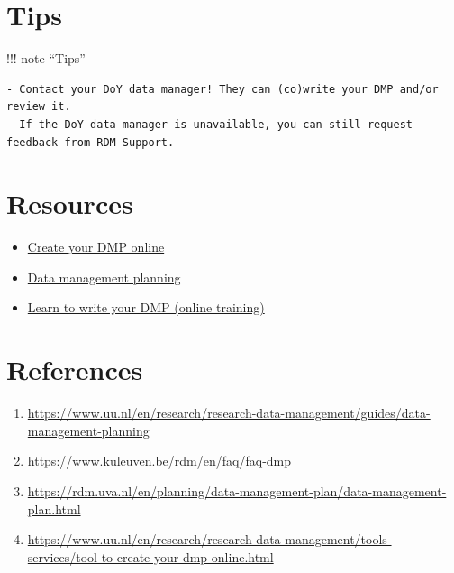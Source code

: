 \documentclass[
  letterpaper,
  DIV=11,
  numbers=noendperiod]{scrreprt}
\providecommand{\tightlist}{%
  \setlength{\itemsep}{0pt}\setlength{\parskip}{0pt}}\usepackage{longtable,booktabs,array}
\begin{document}
\hypertarget{tips}{%
\section*{Tips}\label{tips}}


!!! note ``Tips''

\begin{verbatim}
- Contact your DoY data manager! They can (co)write your DMP and/or review it.
- If the DoY data manager is unavailable, you can still request feedback from RDM Support.
\end{verbatim}

\hypertarget{resources}{%
\section*{Resources}\label{resources}}


\begin{itemize}
\tightlist
\item
  \href{https://www.uu.nl/en/research/research-data-management/tools-services/tool-to-create-your-dmp-online}{Create
  your DMP online}
\item
  \href{https://www.uu.nl/en/research/research-data-management/guides/data-management-planning}{Data
  management planning}
\item
  \href{https://www.uu.nl/en/research/research-data-management/training-workshops/online-training-learn-to-write-your-dmp}{Learn
  to write your DMP (online training)}
\end{itemize}

\hypertarget{references}{%
\section*{References}\label{references}}


\begin{enumerate}
\def\labelenumi{\arabic{enumi}.}
\item
  \url{https://www.uu.nl/en/research/research-data-management/guides/data-management-planning}
\item
  \url{https://www.kuleuven.be/rdm/en/faq/faq-dmp}
\item
  \url{https://rdm.uva.nl/en/planning/data-management-plan/data-management-plan.html}
\item
  \url{https://www.uu.nl/en/research/research-data-management/tools-services/tool-to-create-your-dmp-online.html}
\end{enumerate}
\end{document}

